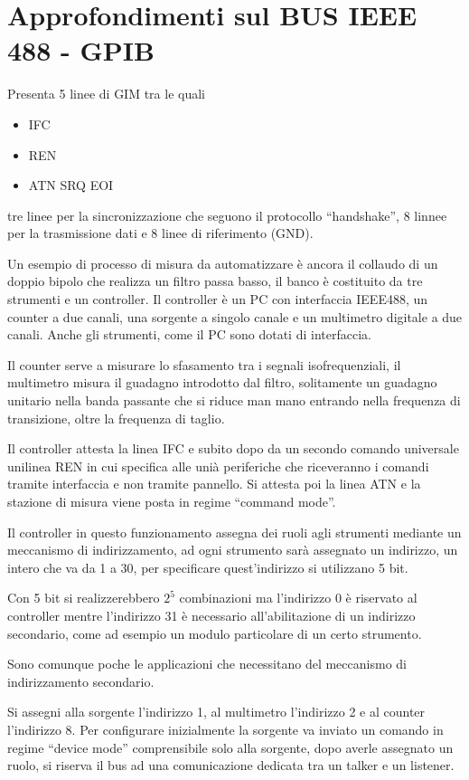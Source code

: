 
\section{Approfondimenti sul BUS IEEE 488 - GPIB}
Presenta 5 linee di GIM tra le quali
\begin{itemize}
 \item IFC
 \item REN
 \item ATN
 SRQ
 EOI
\end{itemize}
tre linee per la sincronizzazione che seguono il protocollo ``handshake'',
8 linnee per la trasmissione dati e 8 linee di riferimento (GND).

Un esempio di processo di misura da automatizzare è ancora il collaudo di un
doppio bipolo che realizza un filtro passa basso, il banco è costituito da tre
strumenti e un controller.
Il controller è un PC con interfaccia IEEE488, un counter a due canali, una
sorgente a singolo canale e un multimetro digitale a due canali.
Anche gli strumenti, come il PC sono dotati di interfaccia.

Il counter serve a misurare lo sfasamento tra i segnali isofrequenziali, il
multimetro misura il guadagno introdotto dal filtro, solitamente un guadagno
unitario nella banda passante che si riduce man mano entrando nella frequenza
di transizione, oltre la frequenza di taglio.

Il controller attesta la linea IFC e subito dopo da un secondo comando
universale unilinea REN in cui specifica alle unià periferiche che riceveranno
i comandi tramite interfaccia e non tramite pannello. Si attesta poi la linea
ATN e la stazione di misura viene posta in regime ``command mode''.

Il controller in questo funzionamento assegna dei ruoli agli strumenti mediante
un meccanismo di indirizzamento, ad ogni strumento sarà assegnato un indirizzo,
un intero che va da 1 a 30, per specificare quest'indirizzo si utilizzano 5 bit.

Con 5 bit si realizzerebbero $2^5$ combinazioni ma l'indirizzo 0 è riservato al
controller mentre l'indirizzo 31 è necessario all'abilitazione di un indirizzo
secondario, come ad esempio un modulo particolare di un certo strumento.

Sono comunque poche le applicazioni che necessitano del meccanismo di
indirizzamento secondario.

Si assegni alla sorgente l'indirizzo 1, al multimetro l'indirizzo 2 e al
counter l'indirizzo 8.
Per configurare inizialmente la sorgente va inviato un comando in regime
``device mode'' comprensibile solo alla sorgente, dopo averle assegnato un
ruolo, si riserva il bus ad una comunicazione dedicata tra un talker e un
listener.

